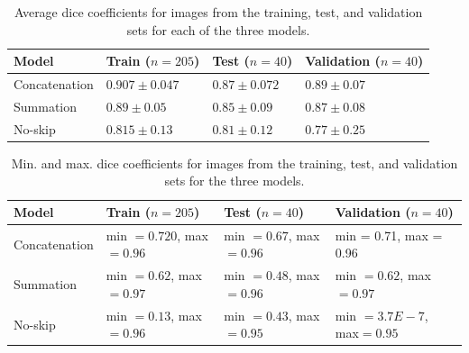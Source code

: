 \documentclass{article}
\begin{document}
\begin{table}[!ht]
\centering
\caption{Average dice coefficients for images from the training, test, and validation sets for each of the three models.}
\label{AvgDice}
\begin{tabular}{|l|l|l|l|}
\hline
Model         & Train ($n=205$)   & Test ($n=40$)    & Validation ($n=40$) \\ \hline
Concatenation & $0.907 \pm 0.047$ & $0.87 \pm 0.072$ & $0.89 \pm 0.07$     \\ \hline
Summation     & $0.89 \pm 0.05$   & $0.85 \pm 0.09$  & $0.87 \pm 0.08$     \\ \hline
No-skip       & $0.815 \pm 0.13$  & $0.81 \pm 0.12$  & $0.77 \pm 0.25$     \\ \hline
\end{tabular}
\label{table:AvgDice}
\end{table}

\begin{table}[!ht]
\centering
\caption{Min. and max. dice coefficients for images from the training, test, and validation sets for the three models.}
\label{MinMaxDice}
\begin{tabular}{|l|l|l|l|}
\hline
Model         & Train ($n=205$)             & Test ($n=40$)              & Validation ($n=40$)       \\ \hline
Concatenation & min $= 0.720$, max $= 0.96$ & min $= 0.67$, max $= 0.96$ & min = 0.71, max = 0.96    \\ \hline
Summation     & min $= 0.62$, max $= 0.97$  & min $= 0.48$, max $= 0.96$ & min $= 0.62$, max $=0.97$ \\ \hline
No-skip       & min $= 0.13$, max $=0.96$   & min $=0.43$, max $= 0.95$  & min $=3.7E-7$, max$=0.95$ \\ \hline
\end{tabular}
\label{table:MinMaxDice}
\end{table}
    
\end{document}
